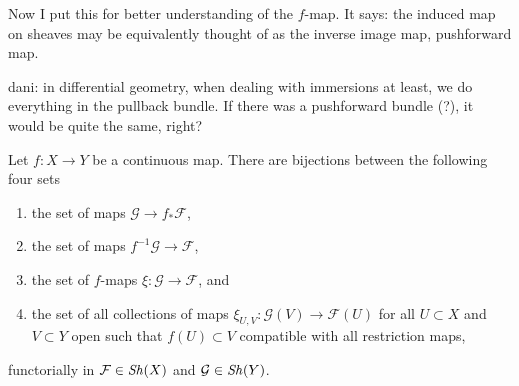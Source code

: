 Now I put this for better understanding of the $f$-map. It says: the induced map
on sheaves may be equivalently thought of as the inverse image map, pushforward
map.

dani: in differential geometry, when dealing with immersions at
least, we do everything in the pullback bundle. If there was a pushforward
bundle (?), it would be quite the same, right?

\begin{lemma}
\label{lemma-f-map}
Let $f : X \to Y$ be a continuous map.
There are bijections between the following four sets
\begin{enumerate}
\item the set of maps $\mathcal{G} \to f_*\mathcal{F}$,
\item the set of maps $f^{-1}\mathcal{G} \to \mathcal{F}$,
\item the set of $f$-maps $\xi : \mathcal{G} \to \mathcal{F}$, and
\item the set of all collections of maps
$\xi_{U, V} : \mathcal{G}(V) \to \mathcal{F}(U)$ for all
$U \subset X$ and $V \subset Y$ open such that $f(U) \subset V$
compatible with all restriction maps,
\end{enumerate}
functorially in $\mathcal{F} \in \mathop{\mathit{Sh}}\nolimits(X)$ and $\mathcal{G} \in \mathop{\mathit{Sh}}\nolimits(Y)$.
\end{lemma}

